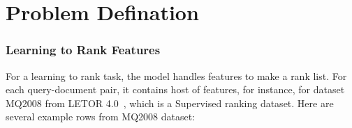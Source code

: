 \chapter{Problem Defination}\label{ch:Problem Defination} %
\subsection{Learning to Rank Features}
For a learning to rank task, the model handles features to make a rank list. For each query-document pair, it contains host of features, for instance, for dataset MQ2008 from LETOR 4.0~\cite{qin2013introducing}, which is a Supervised ranking dataset. Here are several example rows from MQ2008 dataset: 

